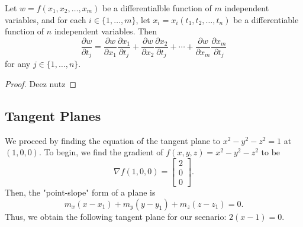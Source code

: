 \documentclass[11pt,twoside=semi,openright,numbers=noenddot]{scrbook}
\begin{document}
%
%    
\begin{theorem}
    Let $w = f(x_1, x_2, \dots, x_m)$ be a differentialble function of $m$
    independent variables, and for each $i \in \{1,\dots,m\}$, let
    $x_i = x_i(t_1,t_2,\dots,t_n)$ be a differentiable function of $n$
    independent variables. Then
    $$\dfrac{\partial w}{\partial t_j} = \dfrac{\partial w}{\partial x_1}
    \dfrac{\partial x_1}{\partial t_j}+
    \dfrac{\partial w}{\partial x_2}\dfrac{\partial x_2}{\partial t_j}+\cdots
    +\dfrac{\partial w}{\partial x_m}\dfrac{\partial x_m}{\partial t_j}$$
    for any $j\in \{1,\dots,n\}$.
\end{theorem}
\begin{proof}
   Deez nutz 
\end{proof}

\subsection{Tangent Planes}
We proceed by finding the equation of the tangent plane to $x^2-y^2-z^2=1$ at
$(1,0,0)$. To begin, we find the gradient of $f(x,y,z)=x^2-y^2-z^2$ to be
$$\nabla f(1,0,0) = \begin{bmatrix} 2 \\ 0 \\ 0 \end{bmatrix}.$$ Then, the "point-slope"
form of a plane is $$m_x(x-x_1)+m_y(y-y_1)+m_z(z-z_1)=0.$$ Thus, we obtain
the following tangent plane for our scenario: $2(x-1)=0$.
\end{document}
